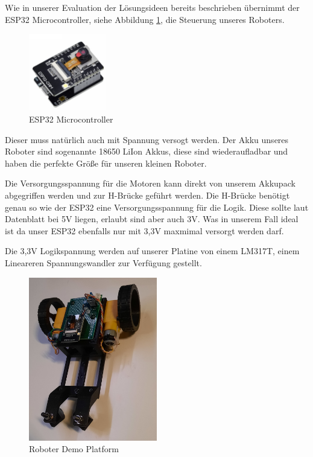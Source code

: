 \begin{flushleft}
    Wie in unserer Evaluation der Lösungsideen bereits beschrieben übernimmt der ESP32 Microcontroller, siehe Abbildung \ref{fig:esp32_mc}, die Steuerung unseres Roboters. 
    
    \begin{figure}[h!]
        \centering
        \includegraphics[width=0.3\textwidth]{imgs/Roboter/Real/esp32.jpg}
        \caption{ESP32 Microcontroller}
        \label{fig:esp32_mc}%
    \end{figure}

    Dieser muss natürlich auch mit Spannung versogt werden.
    Der Akku unseres Roboter sind sogenannte 18650 LiIon Akkus, diese sind wiederaufladbar und haben die perfekte Größe 
    für unseren kleinen Roboter.

    Die Versorgungsspannung für die Motoren kann direkt von unserem Akkupack abgegriffen werden und zur H-Brücke geführt werden.
    Die H-Brücke benötigt genau so wie der ESP32 eine Versorgungsspannung für die Logik.
    Diese sollte laut Datenblatt bei 5V liegen, erlaubt sind aber auch 3V. Was in unserem Fall ideal ist da unser ESP32
    ebenfalls nur mit 3,3V maxmimal versorgt werden darf.

    Die 3,3V Logikspannung werden auf unserer Platine von einem LM317T, einem Lineareren Spannungswandler zur Verfügung gestellt.

    \begin{figure}[h!]
        \centering
        \includegraphics[width=0.5\textwidth, angle=-90,origin=c]{imgs/Roboter/Real/Roboter.jpg}
        \caption{Roboter Demo Platform}
      \end{figure}

\end{flushleft}